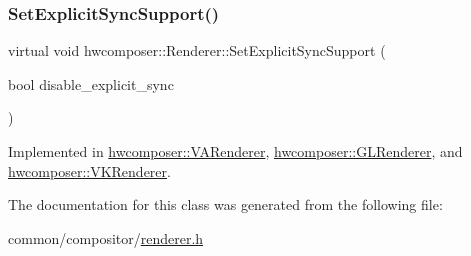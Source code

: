 \mbox{\label{classhwcomposer_1_1Renderer_a8f889bf7b26aa7d1436e9ecf6d15e629}} 
\subsubsection{\texorpdfstring{Set\+Explicit\+Sync\+Support()}{SetExplicitSyncSupport()}}
{\footnotesize\ttfamily virtual void hwcomposer\+::\+Renderer\+::\+Set\+Explicit\+Sync\+Support (\begin{DoxyParamCaption}\item[{bool}]{disable\+\_\+explicit\+\_\+sync }\end{DoxyParamCaption})\hspace{0.3cm}{\ttfamily [pure virtual]}}



Implemented in \mbox{\hyperlink{classhwcomposer_1_1VARenderer_a863e73b1d84e194300aac6f6c30fd037}{hwcomposer\+::\+V\+A\+Renderer}}, \mbox{\hyperlink{classhwcomposer_1_1GLRenderer_a8bd09dabfc0bd223f783454609b48a82}{hwcomposer\+::\+G\+L\+Renderer}}, and \mbox{\hyperlink{classhwcomposer_1_1VKRenderer_ad0a97c5d88ce71c265a6bd5ee139ffe7}{hwcomposer\+::\+V\+K\+Renderer}}.



The documentation for this class was generated from the following file\+:\begin{DoxyCompactItemize}
\item 
common/compositor/\mbox{\hyperlink{renderer_8h}{renderer.\+h}}\end{DoxyCompactItemize}
